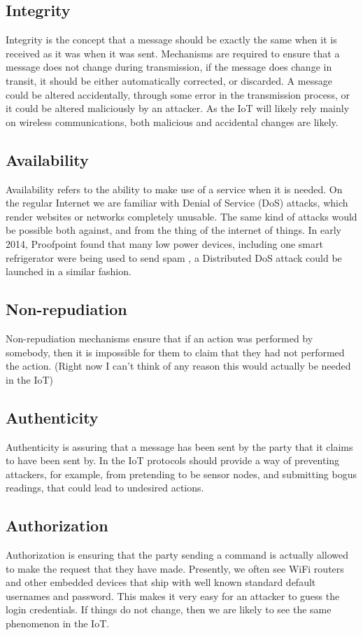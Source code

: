 \documentclass[11pt,journal,compsoc]{IEEEtran}
\begin{document}
\subsection{Integrity}
Integrity is the concept that a message should be exactly the same when it is
received as it was when it was sent. Mechanisms are required to ensure that a
message does not change during transmission, if the message does change in
transit, it should be either automatically corrected, or discarded. A message
could be altered accidentally, through some error in the transmission process,
or it could be altered maliciously by an attacker. As the IoT will likely rely
mainly on wireless communications, both malicious and accidental changes are likely. 

\subsection{Availability}
Availability refers to the ability to make use of a service when it is needed.
On the regular Internet we are familiar with Denial of Service (DoS) attacks,
which render websites or networks completely unusable. The same kind of attacks
would be possible both against, and from the thing of the internet of things.
In early 2014, Proofpoint found that many low power devices, including one
smart refrigerator were being used to send spam \cite{Proofpoint2014}, a
Distributed DoS attack could be launched in a similar fashion.  

\subsection{Non-repudiation}
Non-repudiation mechanisms ensure that if an action was performed by somebody,
then it is impossible for them to claim that they had not performed the action.
(Right now I can't think of any reason this would actually be needed in the
IoT) 

\subsection{Authenticity}
Authenticity is assuring that a message has been sent by the party that it
claims to have been sent by. In the IoT protocols should provide a way of
preventing attackers, for example, from pretending to be sensor nodes, and
submitting bogus readings, that could lead to undesired actions.  

\subsection{Authorization}
Authorization is ensuring that the party sending a command is actually allowed
to make the request that they have made. Presently, we often see WiFi routers
and other embedded devices that ship with well known standard default usernames
and password. This makes it very easy for an attacker to guess the login
credentials. If things do not change, then we are likely to see the same
phenomenon in the IoT. 
\end{document}
